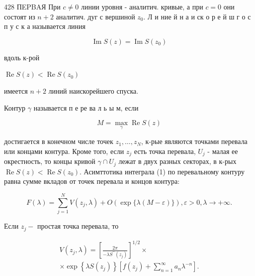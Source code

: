 \documentclass[10pt]{article}
\begin{document}
428 ПEPBAЯ При $c \neq 0$ линии уровня - аналитич. кривые, а при $c=0$ они состоят из $n+2$ аналитич. дуг с вершиной $z_{0}$. Л и ние й н а и ск о р е й ш г о с п у с к а называется линия



\[

\operatorname{Im} S(z)=\operatorname{Im} S\left(z_{0}\right)

\]



вдоль к-рой



$\operatorname{Re} S(z)<\operatorname{Re} S\left(z_{0}\right)$



имеется $n+2$ линий наискорейшего спуска.



Контур $\gamma$ называется п е ре ва л ь ы м, если



\[

M=\max _{\gamma} \operatorname{Re} S(z)

\]



достигается в конечном числе точек $z_{1}, \ldots, z_{N}$, к-рые являются точками перевала или концами контура. Кроме того, если $z_{j}$ есть точка перевала, $U_{j}$ - малая ее окрестность, то концы кривой $\gamma \cap U_{j}$ лежат в двух разных секторах, в к-рых $\operatorname{Re} S(z)<\operatorname{Re} S\left(z_{0}\right)$. Асимттотика интеграла (1) по перевальному контуру равна сумме вкладов от точек перевала и концов контура:



\[

F(\lambda)=\sum_{j=1}^{N} V\left(z_{j}, \lambda\right)+O(\exp \{\lambda(M-\varepsilon)\}), \varepsilon>0, \lambda \rightarrow+\infty .

\]



Если $z_{j}-$ простая точка перевала, то



\[

\begin{gathered}

V\left(z_{j}, \lambda\right)=\left[\frac{2 \pi}{-\lambda S^{\prime \prime}\left(z_{j}\right)}\right]^{1 / 2} \times \\

\times \exp \left\{\lambda S\left(z_{j}\right)\right\}\left[f\left(z_{j}\right)+\sum_{n=1}^{\infty} a_{n} \lambda^{-n}\right] .

\end{gathered}

\]
\end{document}
